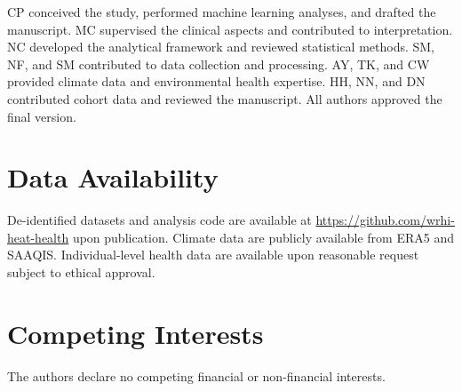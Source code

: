 \documentclass[11pt,a4paper]{article}
\begin{document}
CP conceived the study, performed machine learning analyses, and drafted the manuscript. MC supervised the clinical aspects and contributed to interpretation. NC developed the analytical framework and reviewed statistical methods. SM, NF, and SM contributed to data collection and processing. AY, TK, and CW provided climate data and environmental health expertise. HH, NN, and DN contributed cohort data and reviewed the manuscript. All authors approved the final version.

\section*{Data Availability}

De-identified datasets and analysis code are available at \url{https://github.com/wrhi-heat-health} upon publication. Climate data are publicly available from ERA5 and SAAQIS. Individual-level health data are available upon reasonable request subject to ethical approval.

\section*{Competing Interests}

The authors declare no competing financial or non-financial interests.



\end{document}
